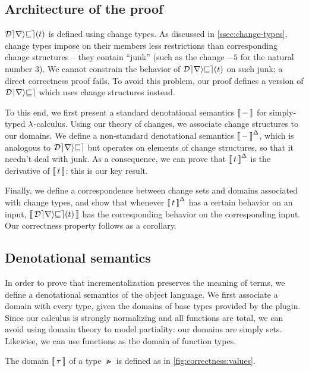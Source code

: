 



\subsection{Architecture of the proof}

$\Derive{t}$ is defined using change types. As discussed in
\cref{ssec:change-types}, change types impose on their members
less restrictions than corresponding change structures -- they
contain ``junk'' (such as the change $-5$ for the natural number $3$). 
We cannot constrain the behavior of
$\Derive{t}$ on such junk; a direct correctness proof fails. To
avoid this problem, our proof defines a version of $\mathcal{Derive}$
which uses change structures instead.


To this end, we first present a standard denotational semantics
$\Eval{-}$ for simply-typed $\lambda$-calculus. Using our theory of
changes, we associate change structures to our domains. We define
a non-standard denotational semantics $\EvalInc{-}$, which is
analogous to $\mathcal{Derive}$ but operates on elements of change
structures, so that it needn't deal with junk. As a consequence,
we can prove that $\EvalInc{t}$ is the derivative of $\Eval{t}$:
this is our key result.

Finally, we define a correspondence between change sets and
domains associated with change types, and show that whenever
$\EvalInc{t}$ has a certain behavior on an input,
$\Eval{\Derive{t}}$ has the corresponding behavior on the
corresponding input. Our correctness property follows as a
corollary.

\subsection{Denotational semantics}
\label{sec:denotational-sem}

In order to prove that incrementalization preserves the meaning
of terms, we define a denotational semantics of the object
language. We first associate a domain with every type, given the
domains of base types provided by the plugin. Since our calculus
is strongly normalizing and all functions are total, we can
avoid using domain theory to model partiality: our domains are
simply sets. Likewise, we can use functions as the domain of function types.


\begin{definition}[Domains]
  The domain $\Eval{\Gt}$ of a type $\Gt$ is defined as in
  \cref{fig:correctness:values}.
\end{definition}


